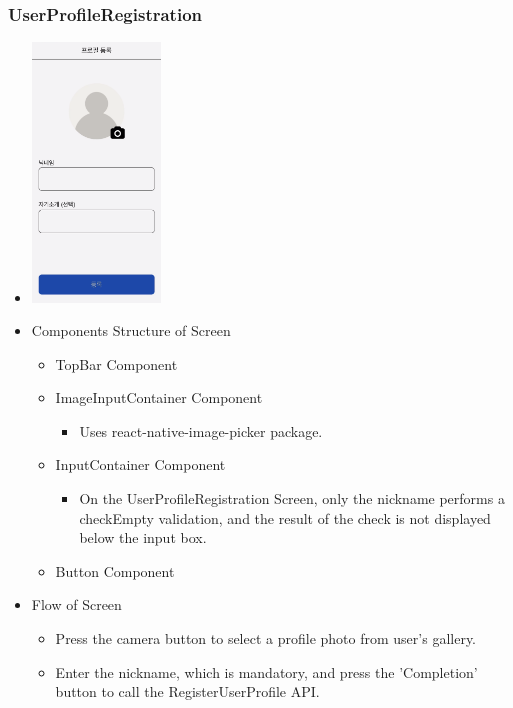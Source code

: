 \documentclass[conference]{IEEEtran}
\begin{document}
\subsubsection{UserProfileRegistration}
\begin{itemize}
    \item[] \includegraphics[width=0.27\textwidth]{img/Screen/6_UserProfile.png}
    \item Components Structure of Screen
    \begin{itemize}
        \item TopBar Component
        \item ImageInputContainer Component
        \begin{itemize}
            \item Uses react-native-image-picker package.
        \end{itemize}
        \item InputContainer Component
        \begin{itemize}
            \item On the UserProfileRegistration Screen, only the nickname performs a checkEmpty validation, and the result of the check is not displayed below the input box.
        \end{itemize}
        \item Button Component
    \end{itemize}
    \item Flow of Screen
    \begin{itemize}
        \item Press the camera button to select a profile photo from user's gallery.
        \item Enter the nickname, which is mandatory, and press the 'Completion' button to call the RegisterUserProfile API.
        \\
    \end{itemize}
\end{itemize}
\newpage
\end{document}
